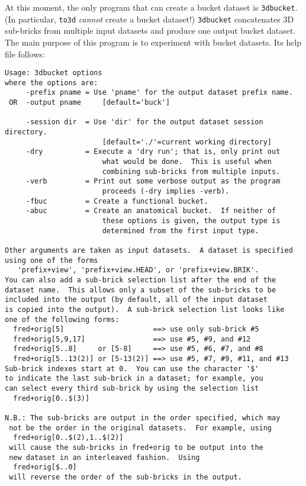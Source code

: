 At this moment, the only program that can create a bucket dataset is
{\tt 3dbucket}.  (In particular, {\tt to3d} {\it cannot\/} create
a bucket dataset!)  {\tt 3dbucket} concatenates 3D sub-bricks from
multiple input datasets and produce one output bucket dataset.
The main purpose of this program is to experiment with bucket datasets.
Its help file follows:
\begin{verbatim}
Usage: 3dbucket options
where the options are:
     -prefix pname = Use 'pname' for the output dataset prefix name.
 OR  -output pname     [default='buck']

     -session dir  = Use 'dir' for the output dataset session directory.
                       [default='./'=current working directory]
     -dry          = Execute a 'dry run'; that is, only print out
                       what would be done.  This is useful when
                       combining sub-bricks from multiple inputs.
     -verb         = Print out some verbose output as the program
                       proceeds (-dry implies -verb).
     -fbuc         = Create a functional bucket.
     -abuc         = Create an anatomical bucket.  If neither of
                       these options is given, the output type is
                       determined from the first input type.

Other arguments are taken as input datasets.  A dataset is specified
using one of the forms
   'prefix+view', 'prefix+view.HEAD', or 'prefix+view.BRIK'.
You can also add a sub-brick selection list after the end of the
dataset name.  This allows only a subset of the sub-bricks to be
included into the output (by default, all of the input dataset
is copied into the output).  A sub-brick selection list looks like
one of the following forms:
  fred+orig[5]                     ==> use only sub-brick #5
  fred+orig[5,9,17]                ==> use #5, #9, and #12
  fred+orig[5..8]     or [5-8]     ==> use #5, #6, #7, and #8
  fred+orig[5..13(2)] or [5-13(2)] ==> use #5, #7, #9, #11, and #13
Sub-brick indexes start at 0.  You can use the character '$'
to indicate the last sub-brick in a dataset; for example, you
can select every third sub-brick by using the selection list
  fred+orig[0..$(3)]

N.B.: The sub-bricks are output in the order specified, which may
 not be the order in the original datasets.  For example, using
  fred+orig[0..$(2),1..$(2)]
 will cause the sub-bricks in fred+orig to be output into the
 new dataset in an interleaved fashion.  Using
  fred+orig[$..0]
 will reverse the order of the sub-bricks in the output.


\end{verbatim}
